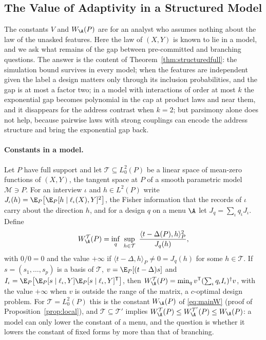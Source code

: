\subsection{The Value of Adaptivity in a Structured Model}\label{app:structured}
The constants $V$ and $W_\A(P)$ are for an analyst who assumes nothing about
the law of the unasked features. Here the law of $(X,Y)$ is known to lie in a
model, and we ask what remains of the gap between pre-committed and branching
questions. The answer is the content of Theorem~\ref{thm:structuredfull}: the
simulation bound survives in every model; when the features are independent given the label a design matters only through its inclusion probabilities, and the gap is at most a factor two; in a model with interactions of
order at most $k$ the exponential gap becomes polynomial in the cap at
product laws and near them, and it disappears for the address contrast when
$k=2$; but parsimony alone does not help, because pairwise laws with strong
couplings can encode the address structure and bring the exponential gap
back.

\paragraph{Constants in a model.}
Let $P$ have full support and let $\mathcal T\subseteq L^2_0(P)$ be a linear
space of mean-zero functions of $(X,Y)$, the tangent space at $P$ of a smooth
parametric model $\mathcal M\ni P$. For an interview $\iota$ and $h\in L^2(P)$
write $J_\iota(h)=\E_P\big[\E_P[h\mid\ell_\iota(X),Y]^2\big]$, the Fisher
information that the records of $\iota$ carry about the direction $h$, and
for a design $q$ on a menu $\A$ let $J_q=\sum_\iota q_\iota J_\iota$. Define
\begin{equation}
 W^{\mathcal T}_\A(P)=\inf_q\ \sup_{h\in\mathcal T}\ \frac{\langle t-\Delta(P),h\rangle_P^2}{J_q(h)},\label{eq:WT}
\end{equation}
with $0/0=0$ and the value $+\infty$ if $\langle t-\Delta,h\rangle_P\ne0=J_q(h)$
for some $h\in\mathcal T$. If $s=(s_1,\ldots,s_p)$ is a basis of
$\mathcal T$, $v=\E_P[(t-\Delta)s]$ and
$I_\iota=\E_P\big[\E_P[s\mid\ell_\iota,Y]\E_P[s\mid\ell_\iota,Y]^{\mathsf T}\big]$,
then $W^{\mathcal T}_\A(P)=\min_qv^{\mathsf T}(\sum_\iota q_\iota I_\iota)^\dagger v$,
with the value $+\infty$ when $v$ is outside the range of the matrix, a
$c$-optimal design problem. For $\mathcal T=L^2_0(P)$ this is the constant
$W_\A(P)$ of \eqref{eq:mainW} (proof of Proposition~\ref{prop:local}), and
$\mathcal T\subseteq\mathcal T'$ implies
$W^{\mathcal T}_\A(P)\le W^{\mathcal T'}_\A(P)\le W_\A(P)$: a model can only
lower the constant of a menu, and the question is whether it lowers the
constant of fixed forms by more than that of branching.


